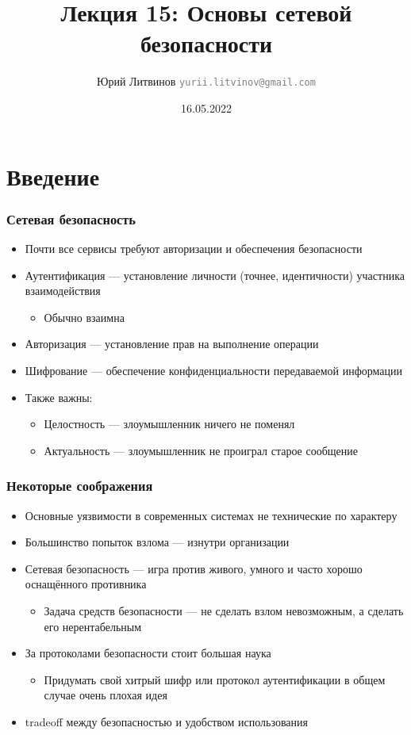 \documentclass[xetex,mathserif,serif]{beamer}
\title{Лекция 15: Основы сетевой безопасности}
\author[Юрий Литвинов]{Юрий Литвинов \newline \textcolor{gray}{\small\texttt{yurii.litvinov@gmail.com}}}
\date{16.05.2022}
\begin{document}
    \frame{\titlepage}

    \section{Введение}

    \begin{frame}
        \frametitle{Сетевая безопасность}
        \begin{itemize}
            \item Почти все сервисы требуют авторизации и обеспечения безопасности
            \item Аутентификация --- установление личности (точнее, идентичности) участника взаимодействия
            \begin{itemize}
                \item Обычно взаимна
            \end{itemize}
            \item Авторизация --- установление прав на выполнение операции
            \item Шифрование --- обеспечение конфиденциальности передаваемой информации
            \item Также важны:
            \begin{itemize}
                \item Целостность --- злоумышленник ничего не поменял
                \item Актуальность --- злоумышленник не проиграл старое сообщение
            \end{itemize} 
        \end{itemize}
    \end{frame}

    \begin{frame}
        \frametitle{Некоторые соображения}
        \begin{itemize}
            \item Основные уязвимости в современных системах не технические по характеру
            \item Большинство попыток взлома --- изнутри организации
            \item Сетевая безопасность --- игра против живого, умного и часто хорошо оснащённого противника
            \begin{itemize}
                \item Задача средств безопасности --- не сделать взлом невозможным, а сделать его нерентабельным
            \end{itemize}
            \item За протоколами безопасности стоит большая наука
            \begin{itemize}
                \item Придумать свой хитрый шифр или протокол аутентификации в общем случае очень плохая идея
            \end{itemize} 
            \item tradeoff между безопасностью и удобством использования
        \end{itemize}
    \end{frame}
\end{document}
